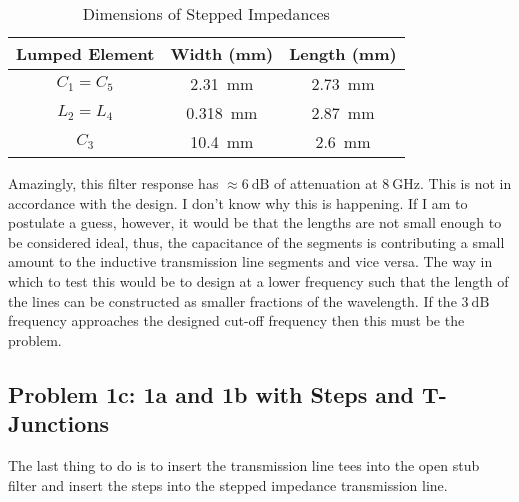     \begin{table}[h]
        \centering
        \caption{Dimensions of Stepped Impedances}
        \label{tab:1b_stepped_impedance_dimensions}
        \begin{tabular}{|c|c|c|}
            \hline Lumped Element & Width (mm)  & Length (mm) \\
            \hline $ C_1 = C_5 $ & \SI{2.31}{mm} & \SI{2.73}{mm} \\
            \hline $ L_2 = L_4 $ & \SI{.318}{mm} & \SI{2.87}{mm}  \\
            \hline $ C_3 $ & \SI{10.4}{mm} & \SI{2.6}{mm}  \\
            \hline
        \end{tabular}
    \end{table}

    Amazingly, this filter response has $\approx \SI{6}{\deci\bel} $ of
    attenuation at $ \SI{8}{\giga\hertz} $. This is not in accordance with the
    design. I don't know why this is happening. If I am to postulate a guess,
    however, it would be that the lengths are not small enough to be considered
    ideal, thus, the capacitance of the segments is contributing a small amount
    to the inductive transmission line segments and vice versa. The way in which
    to test this would be to design at a  lower frequency such that the
    length of the lines can be constructed as smaller fractions of the
    wavelength. If the $\SI{3}{\deci\bel}$ frequency approaches the designed
    cut-off frequency then this must be the problem.

    \subsection*{Problem 1c: 1a and 1b with Steps and T-Junctions}

    The last thing to do is to insert the transmission line tees into the open
    stub filter and insert the steps into the stepped impedance transmission
    line.
